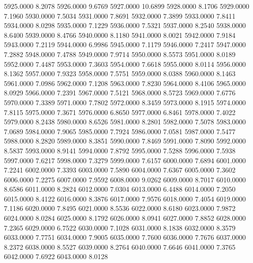 5925.0000      8.2078
5926.0000      9.6769
5927.0000     10.6899
5928.0000      8.1706
5929.0000      7.1960
5930.0000      7.5034
5931.0000      7.8691
5932.0000      7.3899
5933.0000      7.8411
5934.0000      8.0298
5935.0000      7.1229
5936.0000      7.5321
5937.0000      8.2540
5938.0000      8.6400
5939.0000      8.4766
5940.0000      8.1180
5941.0000      8.0021
5942.0000      7.9184
5943.0000      7.2119
5944.0000      6.9986
5945.0000      7.1179
5946.0000      7.2417
5947.0000      7.2882
5948.0000      7.4788
5949.0000      7.9714
5950.0000      8.5573
5951.0000      8.0189
5952.0000      7.4487
5953.0000      7.3603
5954.0000      7.6618
5955.0000      8.0114
5956.0000      8.1362
5957.0000      7.9323
5958.0000      7.5751
5959.0000      8.0388
5960.0000      8.1463
5961.0000      7.0986
5962.0000      7.1208
5963.0000      7.8230
5964.0000      8.4106
5965.0000      8.0929
5966.0000      7.2391
5967.0000      7.5121
5968.0000      8.5723
5969.0000      7.6776
5970.0000      7.3389
5971.0000      7.7802
5972.0000      8.3459
5973.0000      8.1915
5974.0000      7.8115
5975.0000      7.3671
5976.0000      6.8650
5977.0000      6.8461
5978.0000      7.4022
5979.0000      8.2438
5980.0000      8.6526
5981.0000      8.2801
5982.0000      7.5078
5983.0000      7.0689
5984.0000      7.9065
5985.0000      7.7924
5986.0000      7.0581
5987.0000      7.5477
5988.0000      8.2820
5989.0000      8.3851
5990.0000      7.8469
5991.0000      7.8090
5992.0000      8.5837
5993.0000      8.9141
5994.0000      7.8792
5995.0000      7.5288
5996.0000      7.5938
5997.0000      7.6217
5998.0000      7.3279
5999.0000      7.6157
6000.0000      7.6894
6001.0000      7.2241
6002.0000      7.3393
6003.0000      7.5890
6004.0000      7.6367
6005.0000      7.3602
6006.0000      7.2275
6007.0000      7.9592
6008.0000      9.0262
6009.0000      8.7017
6010.0000      8.6586
6011.0000      8.2824
6012.0000      7.0304
6013.0000      6.4488
6014.0000      7.2050
6015.0000      8.4122
6016.0000      8.3876
6017.0000      7.9576
6018.0000      7.4054
6019.0000      7.1186
6020.0000      7.8495
6021.0000      8.5536
6022.0000      8.6180
6023.0000      7.9872
6024.0000      8.0284
6025.0000      8.1792
6026.0000      8.0941
6027.0000      7.8852
6028.0000      7.2365
6029.0000      6.7522
6030.0000      7.1028
6031.0000      8.1838
6032.0000      8.3579
6033.0000      7.7751
6034.0000      7.9005
6035.0000      7.7600
6036.0000      7.7676
6037.0000      8.2372
6038.0000      8.5527
6039.0000      8.2764
6040.0000      7.6646
6041.0000      7.3765
6042.0000      7.6922
6043.0000      8.0128
